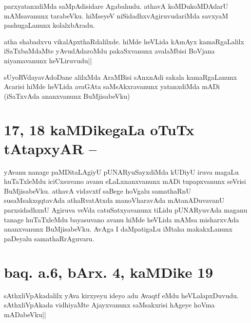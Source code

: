 
\begin{artha}
parxyatanxdiMda saMpAdisidare Agabahudu. athavA koMDukoMDAdarU 
mAMsavanunx tarabeVku. hiMseyeV niSidadhxvAgiruvudariMda savxyaM 
pashugaLanunx kolalxbAradu.
\end{artha}


\begin{artha}
atha shabadxvu vikalApxthaRdalilxde. hiMde heVLida kAmAyx 
kamaRgaLalilx iSaTxbaMdaMte yAvudAdaroMdu pakaSxvanunx avalaMbisi 
BoVjana niyamavanunx heVLiruvudu||
\end{artha}


\begin{artha}
sUyoRVdayavAdoDane alilxMda AraMBisi sAnxnAdi sakala kamaRgaLanunx 
Acarisi hiMde heVLida avaGAta saMsAkxravanunx yatanxdiMda mADi 
(iSaTxvAda ananxvanunx BuMjisabeVku)
\end{artha}

\section*{17, 18 kaMDikegaLa oTuTx tAtapxyAR --}
yAvanu nanage paMDitaLAgiyU pUNARyuSayxdiMda kUDiyU iruva magaLu 
huTaTxleMdu iciCxsuvano avanu eLaLxnanxvanunx mADi tupapxvanunx 
seVrisi BuMjisabeVku. athavA vidavxtf saBege hoVgalu samathaRnU 
susaMsakxqqtavAda athaRvatAtxda manoVharavAda mAtanADuvavanU 
parxsidadhxnU Agiruva veVda catuSatxyavanunx tiLidu pUNARyuvAda maganu 
tanage huTaTxleMdu bayasuvano avanu hiMde heVLida mAMsa misharxvAda 
ananxvanunx BuMjisabeVku. AvAga I daMpatigaLu iMtaha makakxLanunx 
paDeyalu samathaRrAguvaru.

\section*{baq. a.6, bArx. 4, kaMDike 19}

\stext


\begin{artha}
sAthxliVpAkadalilx yAva kirxyeyu ideyo adu Avaqtf eMdu 
heVLalapxDuvudu. sAthxliVpAkada vidhiyaMte Ajayxvanunx saMsakxrisi 
hAgeye hoVma mADabeVku||
\end{artha}

